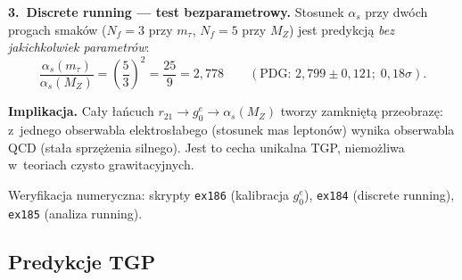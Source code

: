 \begin{remark}
\medskip\noindent
\textbf{3.\ Discrete running --- test bezparametrowy.}
Stosunek $\alpha_s$ przy dw\'och progach smak\'ow
($N_f = 3$ przy $m_\tau$, $N_f = 5$ przy $M_Z$)
jest predykcj\k{a} \emph{bez jakichkolwiek parametr\'ow}:
\begin{equation}\label{eq:ratio-highlight}
  \frac{\alpha_s(m_\tau)}{\alpha_s(M_Z)}
  = \left(\frac{5}{3}\right)^{\!2} = \frac{25}{9} = 2{,}778
  \qquad (\text{PDG: } 2{,}799 \pm 0{,}121;\; 0{,}18\sigma).
\end{equation}

\medskip\noindent
\textbf{Implikacja.}
Ca\l{}y \l{}a\'ncuch $r_{21} \to g_0^e \to \alpha_s(M_Z)$
tworzy zamkni\k{e}t\k{a} przeobraz\k{e}: z~jednego obserwabla
elektros\l{}abego (stosunek mas lepton\'ow) wynika obserwabla
QCD (sta\l{}a sprz\k{e}\.zenia silnego). Jest to cecha unikalna TGP,
niemo\.zliwa w~teoriach czysto grawitacyjnych.

Weryfikacja numeryczna: skrypty \texttt{ex186} (kalibracja $g_0^e$),
\texttt{ex184} (discrete running), \texttt{ex185} (analiza running).
\end{remark}

\subsection{Predykcje TGP}\label{ssec:pred}

